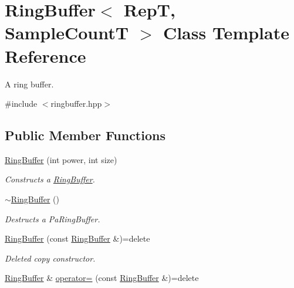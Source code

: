 \hypertarget{classRingBuffer}{\section{Ring\+Buffer$<$ Rep\+T, Sample\+Count\+T $>$ Class Template Reference}
\label{classRingBuffer}
}


A ring buffer.  




{\ttfamily \#include $<$ringbuffer.\+hpp$>$}

\subsection*{Public Member Functions}
\begin{DoxyCompactItemize}
\item 
\hyperlink{classRingBuffer_a2f831ec4941885db960a833cb807465e}{Ring\+Buffer} (int power, int size)
\begin{DoxyCompactList}\small\item\em Constructs a \hyperlink{classRingBuffer}{Ring\+Buffer}. \end{DoxyCompactList}\item 
\hypertarget{classRingBuffer_a39d93b7f608eb69a7a569e61b5abc979}{\hyperlink{classRingBuffer_a39d93b7f608eb69a7a569e61b5abc979}{$\sim$\+Ring\+Buffer} ()}\label{classRingBuffer_a39d93b7f608eb69a7a569e61b5abc979}

\begin{DoxyCompactList}\small\item\em Destructs a Pa\+Ring\+Buffer. \end{DoxyCompactList}\item 
\hypertarget{classRingBuffer_a16e7e006ded5d4aad8b37ee7bea8f90d}{\hyperlink{classRingBuffer_a16e7e006ded5d4aad8b37ee7bea8f90d}{Ring\+Buffer} (const \hyperlink{classRingBuffer}{Ring\+Buffer} \&)=delete}\label{classRingBuffer_a16e7e006ded5d4aad8b37ee7bea8f90d}

\begin{DoxyCompactList}\small\item\em Deleted copy constructor. \end{DoxyCompactList}\item 
\hypertarget{classRingBuffer_a6f552e291e577aeffc57b846969d11d6}{\hyperlink{classRingBuffer}{Ring\+Buffer} \& \hyperlink{classRingBuffer_a6f552e291e577aeffc57b846969d11d6}{operator=} (const \hyperlink{classRingBuffer}{Ring\+Buffer} \&)=delete}\label{classRingBuffer_a6f552e291e577aeffc57b846969d11d6}


\end{DoxyCompactItemize}
